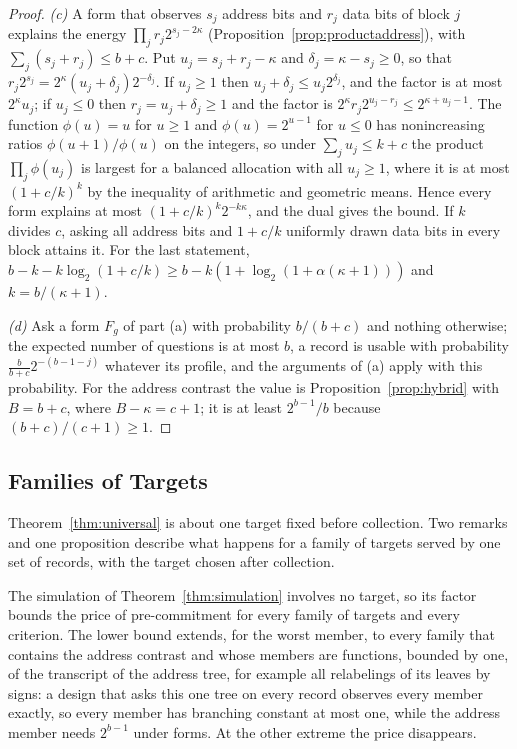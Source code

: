 \begin{proof}
\emph{(c)} A form that observes $s_j$ address bits and $r_j$ data bits of block $j$ explains the energy $\prod_jr_j2^{s_j-2\kappa}$ (Proposition~\ref{prop:productaddress}), with $\sum_j(s_j+r_j)\le b+c$. Put $u_j=s_j+r_j-\kappa$ and $\delta_j=\kappa-s_j\ge0$, so that $r_j2^{s_j}=2^\kappa(u_j+\delta_j)2^{-\delta_j}$. If $u_j\ge1$ then $u_j+\delta_j\le u_j2^{\delta_j}$, and the factor is at most $2^\kappa u_j$; if $u_j\le0$ then $r_j=u_j+\delta_j\ge1$ and the factor is $2^\kappa r_j2^{u_j-r_j}\le2^{\kappa+u_j-1}$. The function $\phi(u)=u$ for $u\ge1$ and $\phi(u)=2^{u-1}$ for $u\le0$ has nonincreasing ratios $\phi(u+1)/\phi(u)$ on the integers, so under $\sum_ju_j\le k+c$ the product $\prod_j\phi(u_j)$ is largest for a balanced allocation with all $u_j\ge1$, where it is at most $(1+c/k)^k$ by the inequality of arithmetic and geometric means. Hence every form explains at most $(1+c/k)^k2^{-k\kappa}$, and the dual gives the bound. If $k$ divides $c$, asking all address bits and $1+c/k$ uniformly drawn data bits in every block attains it. For the last statement, $b-k-k\log_2(1+c/k)\ge b-k(1+\log_2(1+\alpha(\kappa+1)))$ and $k=b/(\kappa+1)$.

\emph{(d)} Ask a form $F_g$ of part (a) with probability $b/(b+c)$ and nothing otherwise; the expected number of questions is at most $b$, a record is usable with probability $\frac b{b+c}2^{-(b-1-j)}$ whatever its profile, and the arguments of (a) apply with this probability. For the address contrast the value is Proposition~\ref{prop:hybrid} with $B=b+c$, where $B-\kappa=c+1$; it is at least $2^{b-1}/b$ because $(b+c)/(c+1)\ge1$.
\end{proof}

\subsection{Families of Targets}\label{app:families}
Theorem~\ref{thm:universal} is about one target fixed before collection. Two remarks and one proposition describe what happens for a family of targets served by one set of records, with the target chosen after collection.

The simulation of Theorem~\ref{thm:simulation} involves no target, so its factor bounds the price of pre-commitment for every family of targets and every criterion. The lower bound extends, for the worst member, to every family that contains the address contrast and whose members are functions, bounded by one, of the transcript of the address tree, for example all relabelings of its leaves by signs: a design that asks this one tree on every record observes every member exactly, so every member has branching constant at most one, while the address member needs $2^{b-1}$ under forms. At the other extreme the price disappears.

